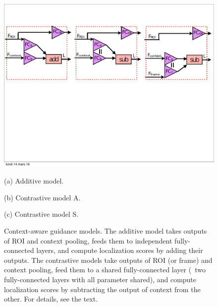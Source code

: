 
\begin{figure}[t] \includegraphics[width=\textwidth, trim={2mm 11.5cm 2mm 3cm},
clip]{eccv16_figures/variants-horiz} \begin{minipage}{0.32\linewidth} \centering
\small{(a) Additive model. } \end{minipage} \begin{minipage}{0.32\linewidth}
\centering \small{(b) Contrastive model A. } \end{minipage}
\begin{minipage}{0.32\linewidth} \centering \small{(c) Contrastive model S. }
\end{minipage}
\caption[Context-aware guidance models]{Context-aware guidance models.
The additive model takes outputs of ROI and context pooling, feeds them to independent fully-connected layers, and compute localization scores by adding their outputs.  
The contrastive models take outputs of ROI (or frame) and context pooling, feed them to a shared fully-connected layer (\ie~two fully-connected layers with all parameter shared), and compute localization scores by subtracting the output of context from the other. For details, see the text.}
\label{fig:models} \end{figure}




